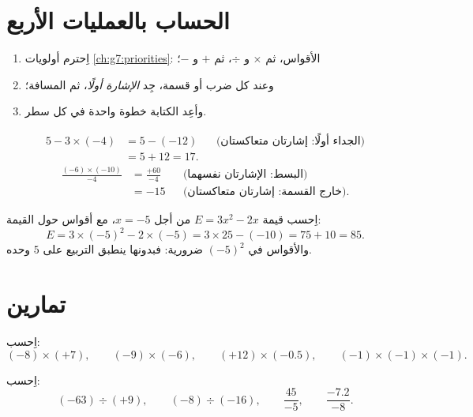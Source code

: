\section{الحساب بالعمليات الأربع}

\begin{method}\label{met:g8:negprod:compute}
\begin{enumerate}
  \item اِحترم أولويات \cref{ch:g7:priorities}: الأقواس،
        ثم $\times$ و $\div$، ثم $+$ و $-$؛
  \item وعند كل ضرب أو قسمة، جِد \emph{الإشارة
        أولًا}، ثم المسافة؛
  \item وأعِد الكتابة خطوة واحدة في كل سطر.
\end{enumerate}
\end{method}

\begin{example}\label{ex:g8:negprod:compute}
\begin{align*}
5 - 3 \times (-4)
&= 5 - (-12) && \text{(الجداء أولًا: إشارتان متعاكستان)}\\
&= 5 + 12 = 17 .
\end{align*}
\begin{align*}
\frac{(-6) \times (-10)}{-4}
&= \frac{+60}{-4} && \text{(البسط: الإشارتان نفسهما)}\\
&= -15 && \text{(خارج القسمة: إشارتان متعاكستان).}
\end{align*}
\end{example}

\begin{example}\label{ex:g8:negprod:substitute}
اِحسب قيمة $E = 3x^2 - 2x$ من أجل $x = -5$، مع أقواس حول القيمة:
\[
E = 3 \times (-5)^2 - 2 \times (-5)
= 3 \times 25 - (-10)
= 75 + 10 = 85 .
\]
والأقواس في $(-5)^2$ ضرورية: فبدونها ينطبق التربيع
على $5$ وحده.
\end{example}

\section{تمارين}

\begin{exercise}[$\star$]\label{exo:g8:negprod:1}
اِحسب:
\[
(-8) \times (+7), \qquad
(-9) \times (-6), \qquad
(+12) \times (-0.5), \qquad
(-1) \times (-1) \times (-1).
\]
\end{exercise}

\begin{exercise}[$\star$]\label{exo:g8:negprod:2}
اِحسب:
\[
(-63) \div (+9), \qquad
(-8) \div (-16), \qquad
\frac{45}{-5}, \qquad
\frac{-7.2}{-8} .
\]
\end{exercise}

